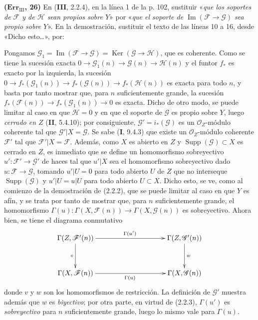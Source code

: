 \documentclass[10pt,oneside]{book}
\newcommand{\oldpage}[2][]{\setcounter{footnote}{0}\marginpar{\scriptsize\textbf{#1}~|~#2}\ignorespaces}
\begin{document}
\noindent\textbf{($\mathbf{Err}_{\mathrm{III}}$, 26)} En (\textbf{III}, 2.2.4), en la
línea 1 de la p. 102, sustituir «\emph{que los soportes de $\mathscr F$ y de
$\mathscr H$ sean propios sobre $Y$}» por «\emph{que el soporte de
$\operatorname{Im}(\mathscr F\to\mathscr G)$ sea propio sobre $Y$}». En la
demostración, sustituir el texto de las líneas 10 a 16, desde «Dicho
esto\ldots{}», por:

\oldpage[III]{222}
Pongamos
$\mathscr G_1=\operatorname{Im}(\mathscr F\to\mathscr G)
=\operatorname{Ker}(\mathscr G\to\mathscr H)$, que es coherente. Como se tiene
la sucesión exacta
$0\to\mathscr G_1(n)\to\mathscr G(n)\to\mathscr H(n)$ y el funtor $f_*$ es
exacto por la izquierda, la sucesión
$0\to f_*(\mathscr G_1(n))\to f_*(\mathscr G(n))\to f_*(\mathscr H(n))$ es
exacta para todo $n$, y basta por tanto mostrar que, para $n$ suficientemente
grande, la sucesión $f_*(\mathscr F(n))\to f_*(\mathscr G_1(n))\to0$ es exacta.
Dicho de otro modo, se puede limitar al caso en que $\mathscr H=0$ y en que el
soporte de $\mathscr G$ es propio sobre $Y$, luego \emph{cerrado en $Z$}
(\textbf{II}, 5.4.10); por consiguiente, $\mathscr G'=i_*(\mathscr G)$ es un
$\mathscr O_Z$-módulo coherente tal que $\mathscr G'|X=\mathscr G$. Se sabe
(\textbf I, 9.4.3) que existe un $\mathscr O_Z$-módulo coherente $\mathscr F'$ tal que
$\mathscr F'|X=\mathscr F$. Además, como $X$ es abierto en $Z$ y
$\operatorname{Supp}(\mathscr G)\subset X$ es cerrado en $Z$, es inmediato que
se define un homomorfismo sobreyectivo $u':\mathscr F'\to\mathscr G'$ de haces
tal que $u'|X$ sea el homomorfismo sobreyectivo dado
$u:\mathscr F\to\mathscr G$, tomando $u'|U=0$ para todo abierto $U$ de $Z$ que
no interseque $\operatorname{Supp}(\mathscr G)$ y $u'|U=u|U$ para todo abierto
$U\subset X$. Dicho esto, se ve, como al comienzo de la demostración de
(2.2.2), que se puede limitar al caso en que $Y$ es afín, y se trata por tanto
de mostrar que, para $n$ suficientemente grande, el homomorfismo
$\Gamma(u):\Gamma(X,\mathscr F(n))\to\Gamma(X,\mathscr G(n))$ es sobreyectivo.
Ahora bien, se tiene el diagrama conmutativo
\[
\xymatrix@C=35mm@R=12mm{
\Gamma(Z,\mathscr F'(n)) \ar[r]^{\Gamma(u')} \ar[d]_v &
\Gamma(Z,\mathscr G'(n)) \ar[d]^w \\
\Gamma(X,\mathscr F(n)) \ar[r]_{\Gamma(u)} & \Gamma(X,\mathscr G(n))
}
\]
donde $v$ y $w$ son los homomorfismos de restricción. La definición de
$\mathscr G'$ muestra además que $w$ es \emph{biyectivo}; por otra parte, en
virtud de (2.2.3), $\Gamma(u')$ es \emph{sobreyectivo} para $n$ suficientemente
grande, luego lo mismo vale para $\Gamma(u)$.
\end{document}
